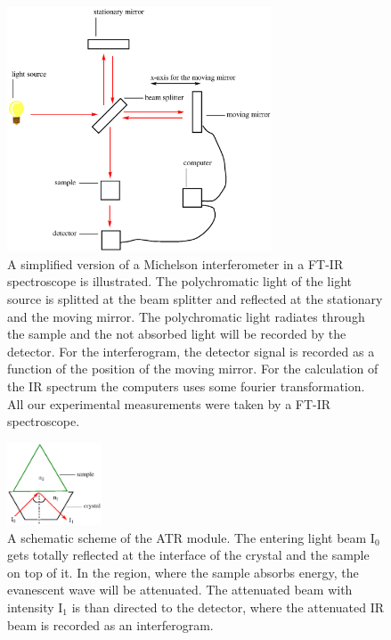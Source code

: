 \documentclass[a4paper,abstracton]{article}	                       %
\begin{document}
\begin{figure}[H]
\centering
 \includegraphics[width=0.7\textwidth] {SkizzeFTIR.eps}
\caption{\label{fig:Skizze1} A simplified version of a Michelson interferometer in a FT-IR spectroscope is illustrated. The polychromatic light of the light source is splitted at the beam splitter and reflected at the stationary and the moving mirror. The polychromatic light radiates through the sample and the not absorbed light will be recorded by the detector. For the interferogram, the detector signal is recorded as a function of the position of the moving mirror. For the calculation of the IR spectrum the computers uses some fourier transformation. All our experimental measurements were taken by a FT-IR spectroscope.} 
\end{figure}

\begin{figure}[H]
\centering
 \includegraphics[width=0.25\textwidth] {SkizzeATR.eps}
\caption{\label{fig:Skizze2}A schematic scheme of the ATR module. The entering light beam I$_{0}$ gets totally reflected at the interface of the crystal and the sample on top of it. In the region, where the sample absorbs energy, the evanescent wave will be attenuated. The attenuated beam with intensity I$_{1}$ is than directed to the detector, where the attenuated IR beam is recorded as an interferogram.} 
\end{figure}
\end{document}
